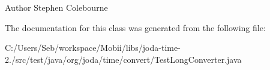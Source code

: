 \begin{DoxyAuthor}{Author}
Stephen Colebourne 
\end{DoxyAuthor}


The documentation for this class was generated from the following file\-:\begin{DoxyCompactItemize}
\item 
C\-:/\-Users/\-Seb/workspace/\-Mobii/libs/joda-\/time-\/2./src/test/java/org/joda/time/convert/Test\-Long\-Converter.\-java\end{DoxyCompactItemize}
